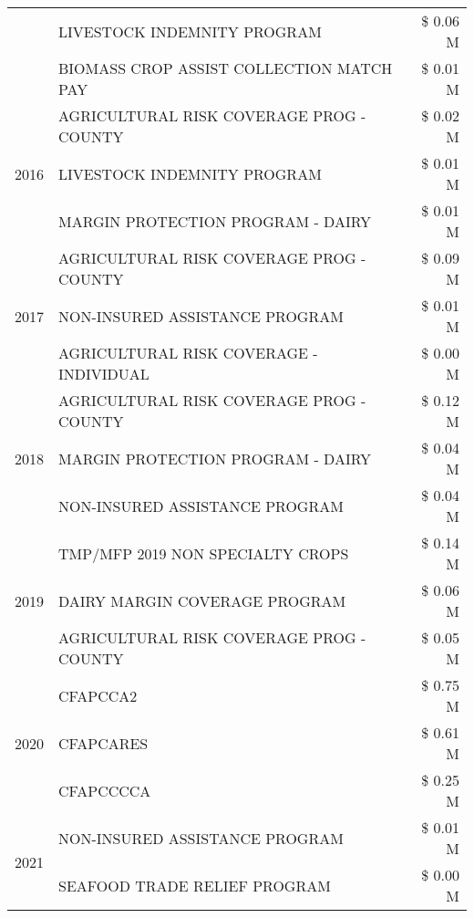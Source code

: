 \begin{tabular}{llr}
 & LIVESTOCK INDEMNITY PROGRAM & \$ 0.06 M \\
 & BIOMASS CROP ASSIST COLLECTION MATCH PAY & \$ 0.01 M \\
\cline{1-3}
\multirow[t]{3}{*}{2016} & AGRICULTURAL RISK COVERAGE PROG - COUNTY & \$ 0.02 M \\
 & LIVESTOCK INDEMNITY PROGRAM & \$ 0.01 M \\
 & MARGIN PROTECTION PROGRAM - DAIRY & \$ 0.01 M \\
\cline{1-3}
\multirow[t]{3}{*}{2017} & AGRICULTURAL RISK COVERAGE PROG - COUNTY & \$ 0.09 M \\
 & NON-INSURED ASSISTANCE PROGRAM & \$ 0.01 M \\
 & AGRICULTURAL RISK COVERAGE - INDIVIDUAL & \$ 0.00 M \\
\cline{1-3}
\multirow[t]{3}{*}{2018} & AGRICULTURAL RISK COVERAGE PROG - COUNTY & \$ 0.12 M \\
 & MARGIN PROTECTION PROGRAM - DAIRY & \$ 0.04 M \\
 & NON-INSURED ASSISTANCE PROGRAM & \$ 0.04 M \\
\cline{1-3}
\multirow[t]{3}{*}{2019} & TMP/MFP 2019 NON SPECIALTY CROPS & \$ 0.14 M \\
 & DAIRY MARGIN COVERAGE PROGRAM & \$ 0.06 M \\
 & AGRICULTURAL RISK COVERAGE PROG - COUNTY & \$ 0.05 M \\
\cline{1-3}
\multirow[t]{3}{*}{2020} & CFAPCCA2 & \$ 0.75 M \\
 & CFAPCARES & \$ 0.61 M \\
 & CFAPCCCCA & \$ 0.25 M \\
\cline{1-3}
\multirow[t]{2}{*}{2021} & NON-INSURED ASSISTANCE PROGRAM & \$ 0.01 M \\
 & SEAFOOD TRADE RELIEF PROGRAM & \$ 0.00 M \\
\cline{1-3}
\bottomrule
\end{tabular}
